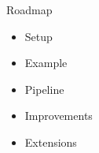 \begin{frame}{Roadmap}
\begin{itemize}\setlength\itemsep{1em}
\item Setup
\item Example
\item Pipeline
\item Improvements
\item Extensions
\end{itemize}
\end{frame}
